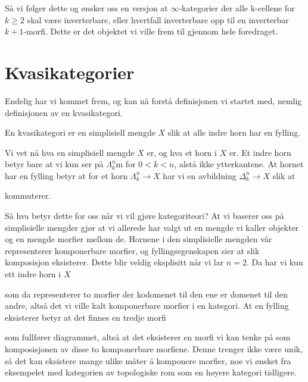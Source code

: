 Så vi følger dette og ønsker oss en versjon at $\infty$-kategorier der alle k-cellene for $k\geq 2$ skal være inverterbare, eller hvertfall inverterbare opp til en inverterbar $k+1$-morfi. 
Dette er det objektet vi ville frem til gjennom hele foredraget. 

\section{Kvasikategorier}

Endelig har vi kommet frem, og kan nå forstå definisjonen vi startet med, nemlig definisjonen av en kvasikategori. 

\begin{definition}
    En kvasikategori er en simplisiell mengde $X$ slik at alle indre horn har en fylling.
\end{definition}

Vi vet nå hva en simplisiell mengde $X$ er, og hva et horn i $X$ er. 
Et indre horn betyr bare at vi kun ser på $\Lambda_k^n$m for $0<k<n$, alstå ikke ytterkantene. 
At hornet har en fylling betyr at for et horn $\Lambda_k^n\longrightarrow X$ har vi en avbildning $\Delta_k^n\longrightarrow X$ slik at 
\begin{center}
\end{center}
kommuterer. 

Så hva betyr dette for oss når vi vil gjøre kategoriteori? 
At vi baserer oss på simplisielle mengder gjør at vi allerede har valgt ut en mengde vi kaller objekter og en mengde morfier mellom de. 
Hornene i den simplisielle mengden vår representerer komponerbare morfier, og fyllingsegenskapen sier at slik komposisjon eksisterer. 
Dette blir veldig eksplisitt når vi lar $n=2$. Da har vi kun ett indre horn i $X$
\begin{center}
\end{center}
som da representerer to morfier der kodomenet til den ene er domenet til den andre, altså det vi ville kalt komponerbare morfier i en kategori. 
At en fylling eksisterer betyr at det finnes en tredje morfi 
\begin{center}
\end{center}
som fullfører diagrammet, altså at det eksisterer en morfi vi kan tenke på som komposisjonen av disse to komponerbare morfiene. 
Denne trenger ikke være unik, så det kan eksistere mange ulike måter å komponere morfier, noe vi ønsket fra eksempelet med kategorien av topologiske rom som en høyere kategori tidligere. 

